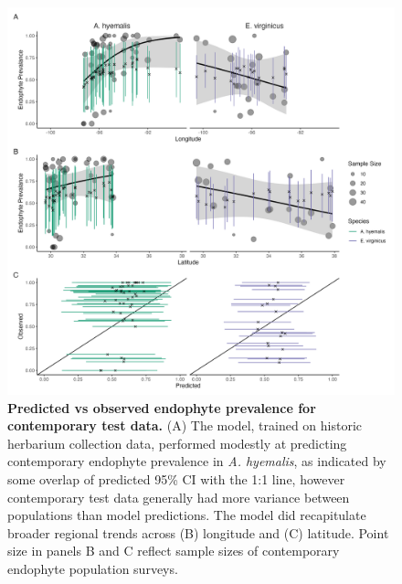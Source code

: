 \documentclass[11pt]{article}
\begin{document}
\begin{figure}[H]
	\centering
	\includegraphics[width = \linewidth]{../Plots/contemp_test_plot.png}
	\caption{\textbf{Predicted vs observed endophyte prevalence for contemporary test data.} (A) The model, trained on historic herbarium collection data, performed modestly at predicting contemporary endophyte prevalence in \emph{A. hyemalis}, as indicated by some overlap of predicted 95\% CI with the 1:1 line, however contemporary test data generally had more variance between populations than model predictions. The model did recapitulate broader regional trends across (B) longitude and (C) latitude. Point size in panels B and C reflect sample sizes of contemporary endophyte population surveys.}
	\label{fig:contemptestplot}
\end{figure}
\end{document}

